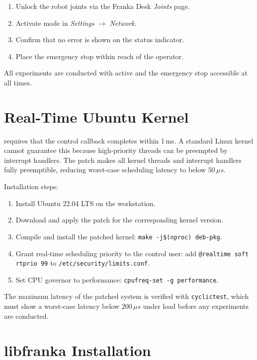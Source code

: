 \begin{enumerate}
  \item Unlock the robot joints via the Franka Desk \textit{Joints} page.
  \item Activate  mode in \textit{Settings} $\to$ \textit{Network}.
  \item Confirm that no error is shown on the status indicator.
  \item Place the emergency stop within reach of the operator.
\end{enumerate}

All experiments are conducted with  active and the emergency stop
accessible at all times.

\section{Real-Time Ubuntu Kernel}
\label{sec:rt_kernel}

 requires that the control callback completes within 1\,ms.
A standard Linux kernel cannot guarantee this because high-priority threads
can be preempted by interrupt handlers.
The  patch makes all kernel threads and interrupt handlers fully
preemptible, reducing worst-case scheduling latency to below $50\,\mu s$.

Installation steps:

\begin{enumerate}
  \item Install Ubuntu 22.04 LTS on the workstation.
  \item Download and apply the  patch for the corresponding
        kernel version.
  \item Compile and install the patched kernel:
        \texttt{make -j\$(nproc) deb-pkg}.
  \item Grant real-time scheduling priority to the control user:
        add \texttt{@realtime soft rtprio 99} to
        \texttt{/etc/security/limits.conf}.
  \item Set CPU governor to performance:
        \texttt{cpufreq-set -g performance}.
\end{enumerate}

The maximum latency of the patched system is verified with
\texttt{cyclictest}, which must show a worst-case latency below
$200\,\mu s$ under load before any  experiments are conducted.

\section{libfranka Installation}
\label{sec:libfranka}

